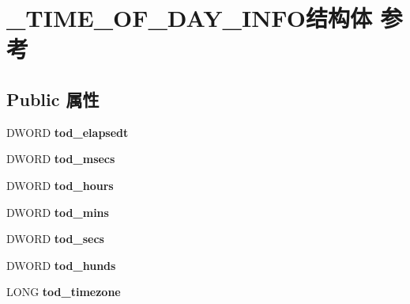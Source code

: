 \hypertarget{struct___t_i_m_e___o_f___d_a_y___i_n_f_o}{}\section{\+\_\+\+T\+I\+M\+E\+\_\+\+O\+F\+\_\+\+D\+A\+Y\+\_\+\+I\+N\+F\+O结构体 参考}
\label{struct___t_i_m_e___o_f___d_a_y___i_n_f_o}
\subsection*{Public 属性}
\begin{DoxyCompactItemize}
\item 
\mbox{\label{struct___t_i_m_e___o_f___d_a_y___i_n_f_o_a37dc15a44e22656fb6668ccc692b92b3}} 
D\+W\+O\+RD {\bfseries tod\+\_\+elapsedt}
\item 
\mbox{\label{struct___t_i_m_e___o_f___d_a_y___i_n_f_o_ace6e0597ee9ab90135ea67cb1eea0ecb}} 
D\+W\+O\+RD {\bfseries tod\+\_\+msecs}
\item 
\mbox{\label{struct___t_i_m_e___o_f___d_a_y___i_n_f_o_a6e5c935d119d58cb69b8c2b8f7f641c9}} 
D\+W\+O\+RD {\bfseries tod\+\_\+hours}
\item 
\mbox{\label{struct___t_i_m_e___o_f___d_a_y___i_n_f_o_ad4a731f4a11560245c8fa98f95e77953}} 
D\+W\+O\+RD {\bfseries tod\+\_\+mins}
\item 
\mbox{\label{struct___t_i_m_e___o_f___d_a_y___i_n_f_o_a022c29a7a9eca32f4e88e7501459dd9f}} 
D\+W\+O\+RD {\bfseries tod\+\_\+secs}
\item 
\mbox{\label{struct___t_i_m_e___o_f___d_a_y___i_n_f_o_a9edf86773eaf143bccd0610a637ecf97}} 
D\+W\+O\+RD {\bfseries tod\+\_\+hunds}
\item 
\mbox{\label{struct___t_i_m_e___o_f___d_a_y___i_n_f_o_af6fddffaf85559fe2e96c3e1aebdd8eb}} 
L\+O\+NG {\bfseries tod\+\_\+timezone}
\item 

\end{DoxyCompactItemize}
